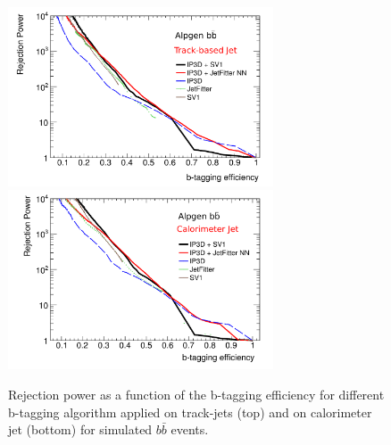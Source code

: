 \begin{figure}[!tp]
\centering
\includegraphics[width=0.7\textwidth]{figure/trackjet/std_eff_rej2.pdf}
\includegraphics[width=0.7\textwidth]{figure/trackjet/std_cal_eff_rej2.pdf}
\caption{Rejection power as a function of the b-tagging efficiency for different b-tagging algorithm applied
	 on track-jets (top) and on calorimeter jet (bottom) for simulated $b\bar{b}$ events.}
\label{fig:eff_rej}
\end{figure}    

